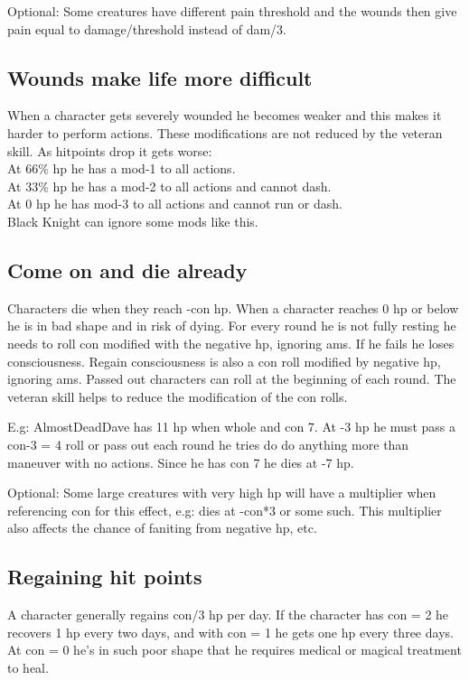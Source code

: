 Optional: Some creatures have different pain threshold and the wounds then give pain equal to damage/threshold instead of dam/3.


\subsection*{Wounds make life more difficult}
When a character gets severely wounded he becomes weaker and this makes it harder to perform actions. These modifications are not reduced by the veteran skill. As hitpoints drop it gets worse:\\
At 66\% hp he has a mod-1 to all actions. \\
At 33\% hp he has a mod-2 to all actions and cannot dash. \\
At 0 hp he has mod-3 to all actions and cannot run or dash.\\
Black Knight can ignore some mods like this.


\subsection*{Come on and die already}
Characters die when they reach -con hp. When a character reaches 0 hp or below he is in bad shape and in risk of dying. For every round he is not fully resting he needs to roll con modified with the negative hp, ignoring ams. If he fails he loses consciousness. Regain consciousness is also a con roll modified by negative hp, ignoring ams. Passed out characters can roll at the beginning of each round. The veteran skill helps to reduce the modification of the con rolls.

E.g: AlmostDeadDave has 11 hp when whole and con 7. At -3 hp he must pass a con-3 = 4 roll or pass out each round he tries do do anything more than maneuver with no actions. Since he has con 7 he dies at -7 hp.

Optional: Some large creatures with very high hp will have a multiplier when referencing con for this effect, e.g: dies at -con*3 or some such. This multiplier also affects the chance of faniting from negative hp, etc.


\subsection*{Regaining hit points}
A character generally regains con/3 hp per day. If the character has con = 2 he recovers 1 hp every two days, and with con = 1 he gets one hp every three days. At con = 0 he's in such poor shape that he requires medical or magical treatment to heal.

